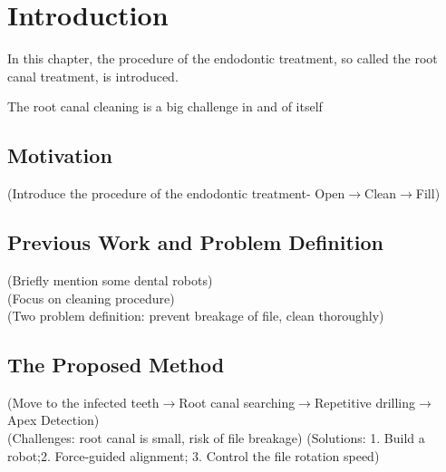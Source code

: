 \chapter{Introduction}
In this chapter, the procedure of the endodontic treatment, so called the root canal treatment, is introduced.

The root canal cleaning is a big challenge in and of itself
\section{Motivation}
(Introduce the procedure of the endodontic treatment- Open$\longrightarrow $Clean$\longrightarrow $Fill)
\section{Previous Work and Problem Definition}
(Briefly mention some dental robots)																\\
(Focus on cleaning procedure)																		\\
(Two problem definition: prevent breakage of file, clean thoroughly)								
\section{The Proposed Method}
(Move to the infected teeth$\longrightarrow $Root canal searching$\longrightarrow $Repetitive drilling$\longrightarrow $Apex Detection)		\\
(Challenges: root canal is small, risk of file breakage)
(Solutions: 1. Build a robot;2. Force-guided alignment; 3. Control the file rotation speed)										
